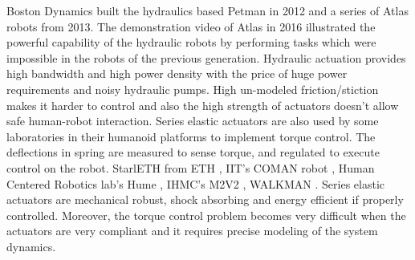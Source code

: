  Boston Dynamics built the hydraulics based Petman \cite{nelson2012petman} in 2012 and a series of Atlas robots from 2013. The demonstration video of Atlas in 2016 illustrated the powerful capability of the hydraulic robots by performing tasks which were impossible in the robots of the previous generation. Hydraulic actuation provides high bandwidth and high power density with the price of huge power requirements and noisy hydraulic pumps. High un-modeled friction/stiction makes it harder to control and also the high strength of actuators doesn't allow safe human-robot interaction. Series elastic actuators are also used by some laboratories in their humanoid platforms to implement torque control. The deflections in spring are measured to sense torque, and regulated to execute control on the robot. StarlETH from ETH \cite{hutter2012starleth}, IIT’s COMAN robot \cite{tsagarakis2013compliant}, Human Centered Robotics lab's Hume \cite{slovich2012hume}, IHMC’s M2V2 \cite{pratt2008design}, WALKMAN \cite{negrello2016walk}. Series elastic actuators are mechanical robust, shock absorbing and energy efficient \cite{kormushev2011bipedal} if properly controlled. Moreover, the torque control problem becomes very difficult when the actuators are very compliant and it requires precise modeling of the system dynamics.

